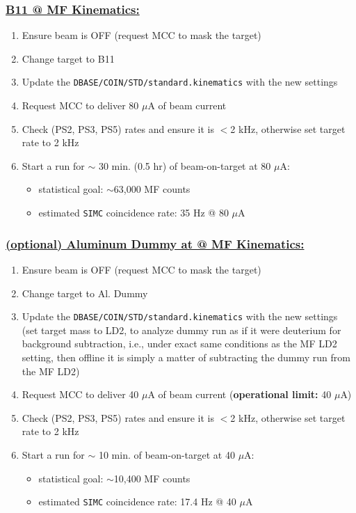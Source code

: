 \documentclass{article}
\begin{document}
\subsubsection*{\underline{B11 @ MF Kinematics:}}
\begin{enumerate}
\item Ensure beam is OFF (request MCC to mask the target)
\item Change target to B11
\item Update the \texttt{DBASE/COIN/STD/standard.kinematics} with the new settings
\item Request MCC to deliver 80 $\mu$A of beam current
\item Check (PS2, PS3, PS5) rates and ensure it is $<$2 kHz, otherwise set target rate to 2 kHz
\item Start a run for $\sim$ 30 min. (0.5 hr) of beam-on-target at 80 $\mu$A:
\begin{itemize}
    \item statistical goal: $\sim$63,000 MF counts
    \item estimated \texttt{SIMC} coincidence rate: 35 Hz @ 80 $\mu$A
\end{itemize}
\end{enumerate}

\subsubsection*{\underline{ (optional) Aluminum Dummy at @ MF Kinematics:}}
\begin{enumerate}
\item Ensure beam is OFF (request MCC to mask the target)
\item Change target to Al. Dummy
\item Update the \texttt{DBASE/COIN/STD/standard.kinematics} with the new settings\\
(set target mass to LD2, to analyze dummy run as if it were deuterium for background subtraction, i.e., under exact same conditions as the MF LD2 setting, then offline it is 
simply a matter of subtracting the dummy run from the MF LD2)
\item Request MCC to deliver 40 $\mu$A of beam current (\textbf{operational limit:} 40 $\mu$A)
\item Check (PS2, PS3, PS5) rates and ensure it is $<$2 kHz, otherwise set target rate to 2 kHz
\item Start a run for $\sim$ 10 min. of beam-on-target at 40 $\mu$A:
\begin{itemize}
    \item statistical goal: $\sim$10,400 MF counts
    \item estimated \texttt{SIMC} coincidence rate: 17.4 Hz @ 40 $\mu$A
\end{itemize}
\end{enumerate}
\end{document}
